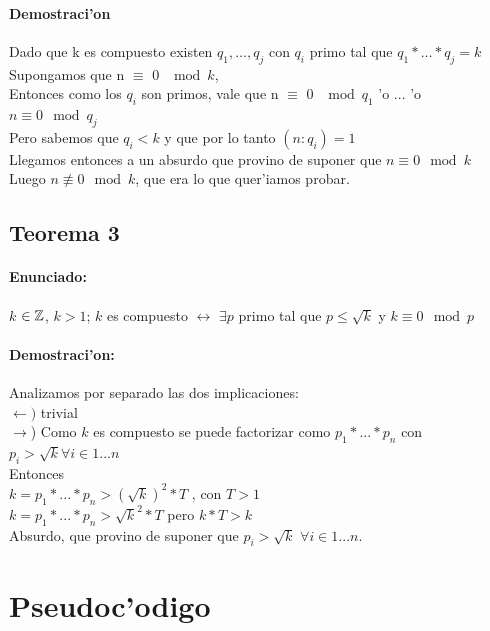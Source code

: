 \paragraph{Demostraci'on}
Dado que k es compuesto existen $q_1,\ldots,q_j$ con $q_i$ primo tal que $q_1*\ldots*q_j = k$ \\
Supongamos que n $\equiv$ 0 $\mod{k}$,\\
Entonces como los $q_i$ son primos, vale que n $\equiv$ 0 $\mod{q_1}$ 'o ... 'o $n \equiv 0 \mod{q_j}$ \\
Pero sabemos que $q_i < k$ y que por lo tanto $(n:q_{i}) = 1$ \\
Llegamos entonces a un absurdo que provino de suponer que  $n \equiv 0 \mod{k}$ \\ 
Luego $n \not\equiv 0 \mod{k}$, que era lo que quer'iamos probar.

\subsection{Teorema 3}
\paragraph{Enunciado:}
$k$ ${\in {\mathbb Z}}$, $k>1$; $k$ es compuesto $\longleftrightarrow$ $\exists p$ primo tal que $p \leq \sqrt{k}$ y $k \equiv 0 \mod{p}$
\paragraph{Demostraci'on:}
Analizamos por separado las dos implicaciones: \\
$\leftarrow)$ trivial \\
$\rightarrow$) Como $k$ es compuesto se puede factorizar como $p_1*...*p_n$ con $p_i > \sqrt{k} \forall i \in {1...n}$\\
Entonces \\
$k = p_1*...*p_n > (\sqrt{k})^2*T$ , con $T>1$\\  
$k = p_1*...*p_n > \sqrt{k}^2*T$ pero $k*T > k$ \\
Absurdo, que provino de suponer que $p_i > \sqrt{k}$ $\forall i \in {1...n}$.\\

\section{Pseudoc'odigo}


